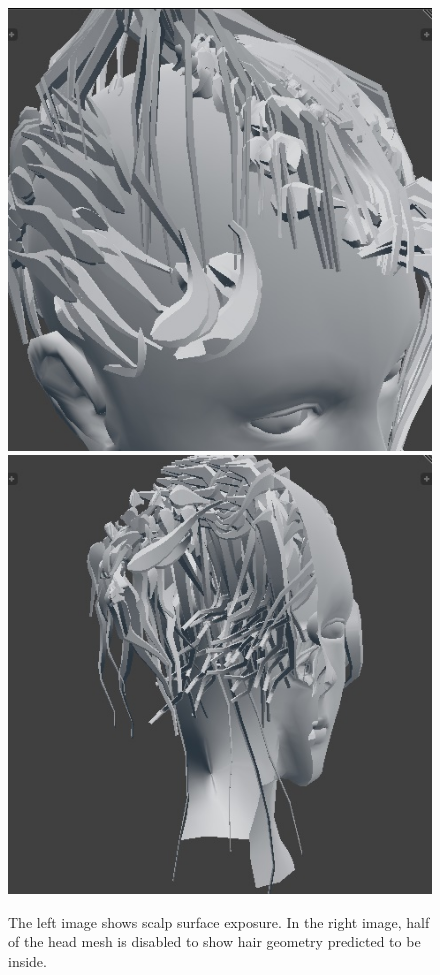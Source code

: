 \documentclass[ %
author={Dillon Keith Diep},
supervisor={Dr. Carl Henrik Ek},
degree={MEng},
title={ART-CG Hair:},
subtitle={Assisted Real-time Content Generation of Stylised Virtual Hair},
type={Research},
year={2017} ]{dissertation}
\begin{document}
\begin{figure}[!h]
	\centering
	\caption{The left image shows scalp surface exposure. In the right image, half of the head mesh is disabled to show hair geometry predicted to be inside.}
	\includegraphics[scale=0.4]{images/baldHair}
	\includegraphics[scale=0.4]{images/intersectHair}
\end{figure}
\end{document}
